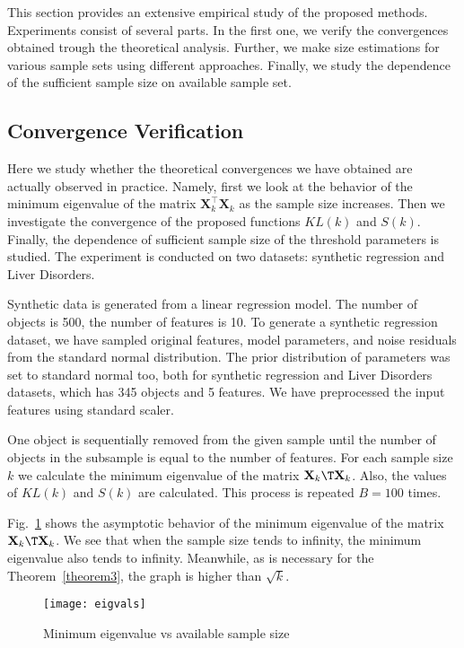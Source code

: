\documentclass[sn-mathphys-num]{sn-jnl}%
\begin{document}
This section provides an extensive empirical study of the proposed methods. Experiments consist of several parts. In the first one, we verify the convergences obtained trough the theoretical analysis. Further, we make size estimations for various sample sets using different approaches. Finally, we study the dependence of the sufficient sample size on available sample set.

\subsection{Convergence Verification}

Here we study whether the theoretical convergences we have obtained are actually observed in practice. Namely, first we look at the behavior of the minimum eigenvalue of the matrix $\mathbf{X}_k^\top \mathbf{X}_k$ as the sample size increases. Then we investigate the convergence of the proposed functions $KL(k)$ and $S(k)$. Finally, the dependence of sufficient sample size of the threshold parameters is studied. The experiment is conducted on two datasets: synthetic regression and Liver Disorders. 

Synthetic data is generated from a linear regression model. The number of objects is 500, the number of features is 10. To generate a synthetic regression dataset, we have sampled original features, model parameters, and noise residuals from the standard normal distribution. The prior distribution of parameters was set to standard normal too, both for synthetic regression and Liver Disorders datasets, which has 345 objects and 5 features.  We have preprocessed the input features using standard scaler.

One object is sequentially removed from the given sample until the number of objects in the subsample is equal to the number of features. For each sample size $k$ we calculate the minimum eigenvalue of the matrix $\mathbf{X}_k\T \mathbf{X}_k$. Also, the values of $KL(k)$ and $S(k)$ are calculated. This process is repeated $B=100$ times.

Fig.~\ref{eigvals} shows the asymptotic behavior of the minimum eigenvalue of the matrix $\mathbf{X}_k\T \mathbf{X}_k$. We see that when the sample size tends to infinity, the minimum eigenvalue also tends to infinity. Meanwhile, as is necessary for the Theorem~\ref{theorem3}, the graph is higher than $\sqrt{k}$.

\begin{figure}[ht]
    \centering
    \texttt{[image: eigvals]}
    \caption{Minimum eigenvalue vs available sample size}
    \label{eigvals}
\end{figure}
\end{document}
